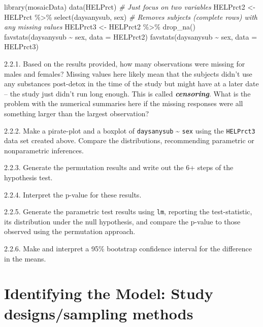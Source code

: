 \documentclass[
]{book}
\newenvironment{Shaded}{\begin{snugshade}}{\end{snugshade}}
\newcommand{\AttributeTok}[1]{\textcolor[rgb]{0.77,0.63,0.00}{#1}}
\newcommand{\CommentTok}[1]{\textcolor[rgb]{0.56,0.35,0.01}{\textit{#1}}}
\newcommand{\FunctionTok}[1]{\textcolor[rgb]{0.00,0.00,0.00}{#1}}
\newcommand{\NormalTok}[1]{#1}
\newcommand{\OtherTok}[1]{\textcolor[rgb]{0.56,0.35,0.01}{#1}}
\newcommand{\SpecialCharTok}[1]{\textcolor[rgb]{0.00,0.00,0.00}{#1}}
\begin{document}
\begin{Shaded}
\begin{Highlighting}[]
\FunctionTok{library}\NormalTok{(mosaicData)}
\FunctionTok{data}\NormalTok{(HELPrct)}
\CommentTok{\# Just focus on two variables}
\NormalTok{HELPrct2 }\OtherTok{\textless{}{-}}\NormalTok{ HELPrct }\SpecialCharTok{\%\textgreater{}\%} \FunctionTok{select}\NormalTok{(daysanysub, sex) }
\CommentTok{\# Removes subjects (complete rows) with any missing values}
\NormalTok{HELPrct3 }\OtherTok{\textless{}{-}}\NormalTok{ HELPrct2 }\SpecialCharTok{\%\textgreater{}\%} \FunctionTok{drop\_na}\NormalTok{() }
\FunctionTok{favstats}\NormalTok{(daysanysub }\SpecialCharTok{\textasciitilde{}}\NormalTok{ sex, }\AttributeTok{data =}\NormalTok{ HELPrct2)}
\FunctionTok{favstats}\NormalTok{(daysanysub }\SpecialCharTok{\textasciitilde{}}\NormalTok{ sex, }\AttributeTok{data =}\NormalTok{ HELPrct3)}
\end{Highlighting}
\end{Shaded}

2.2.1. Based on the results provided, how many observations were missing for males
and females? Missing values here likely mean that the subjects didn't use any
substances post-detox in the time of the study but might have at a later
date -- the study just didn't run long enough. This is called \textbf{\emph{censoring}}.
What is the problem with the numerical summaries here if the missing responses
were all something larger than the largest observation?

2.2.2. Make a pirate-plot and a boxplot of \texttt{daysanysub} \textasciitilde{} \texttt{sex} using the
\texttt{HELPrct3} data set created above. Compare the distributions, recommending
parametric or nonparametric inferences.

2.2.3. Generate the permutation results and write out the 6+ steps of the
hypothesis test.

2.2.4. Interpret the p-value for these results.

2.2.5. Generate the parametric test results using \texttt{lm}, reporting the test-statistic,
its distribution under the null hypothesis, and compare the p-value to those
observed using the permutation approach.

2.2.6. Make and interpret a 95\% bootstrap confidence interval for the difference
in the means.

\hypertarget{chapter3}{%
\chapter{Identifying the Model: Study designs/sampling methods}\label{chapter3}}
\end{document}
